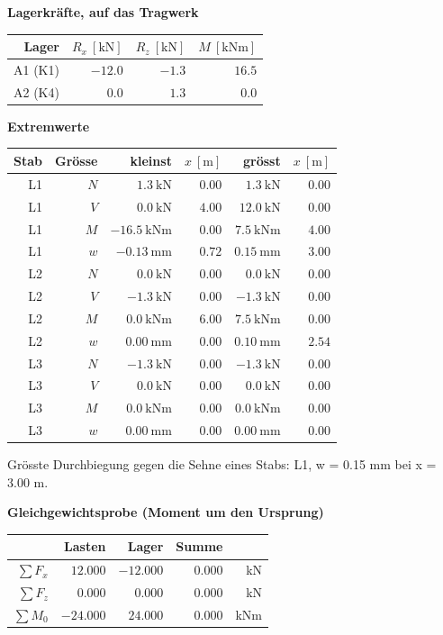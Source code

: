 \documentclass[11pt,a4paper]{article}
\begin{document}
\noindent\textbf{Lagerkräfte, auf das Tragwerk}
\begin{longtable}{rrrr}
\hline
Lager & $R_x\ [\mathrm{kN}]$ & $R_z\ [\mathrm{kN}]$ & $M\ [\mathrm{kNm}]$ \\
\hline
\endhead
A1 (K1) & $-12.0$ & $-1.3$ & $16.5$ \\
A2 (K4) & $0.0$ & $1.3$ & $0.0$ \\
\hline
\end{longtable}
\noindent\textbf{Extremwerte}
\begin{longtable}{rrrrrr}
\hline
Stab & Grösse & kleinst & $x\ [\mathrm{m}]$ & grösst & $x\ [\mathrm{m}]$ \\
\hline
\endhead
L1 & $N$ & $1.3\ \mathrm{kN}$ & $0.00$ & $1.3\ \mathrm{kN}$ & $0.00$ \\
L1 & $V$ & $0.0\ \mathrm{kN}$ & $4.00$ & $12.0\ \mathrm{kN}$ & $0.00$ \\
L1 & $M$ & $-16.5\ \mathrm{kNm}$ & $0.00$ & $7.5\ \mathrm{kNm}$ & $4.00$ \\
L1 & $w$ & $-0.13\ \mathrm{mm}$ & $0.72$ & $0.15\ \mathrm{mm}$ & $3.00$ \\
L2 & $N$ & $0.0\ \mathrm{kN}$ & $0.00$ & $0.0\ \mathrm{kN}$ & $0.00$ \\
L2 & $V$ & $-1.3\ \mathrm{kN}$ & $0.00$ & $-1.3\ \mathrm{kN}$ & $0.00$ \\
L2 & $M$ & $0.0\ \mathrm{kNm}$ & $6.00$ & $7.5\ \mathrm{kNm}$ & $0.00$ \\
L2 & $w$ & $0.00\ \mathrm{mm}$ & $0.00$ & $0.10\ \mathrm{mm}$ & $2.54$ \\
L3 & $N$ & $-1.3\ \mathrm{kN}$ & $0.00$ & $-1.3\ \mathrm{kN}$ & $0.00$ \\
L3 & $V$ & $0.0\ \mathrm{kN}$ & $0.00$ & $0.0\ \mathrm{kN}$ & $0.00$ \\
L3 & $M$ & $0.0\ \mathrm{kNm}$ & $0.00$ & $0.0\ \mathrm{kNm}$ & $0.00$ \\
L3 & $w$ & $0.00\ \mathrm{mm}$ & $0.00$ & $0.00\ \mathrm{mm}$ & $0.00$ \\
\hline
\end{longtable}
Grösste Durchbiegung gegen die Sehne eines Stabs: L1, w = 0.15 mm bei x = 3.00 m.

\noindent\textbf{Gleichgewichtsprobe (Moment um den Ursprung)}
\begin{longtable}{rrrrr}
\hline
 & Lasten & Lager & Summe &  \\
\hline
\endhead
$\sum F_x$ & $12.000$ & $-12.000$ & $0.000$ & kN \\
$\sum F_z$ & $0.000$ & $0.000$ & $0.000$ & kN \\
$\sum M_0$ & $-24.000$ & $24.000$ & $0.000$ & kNm \\
\hline
\end{longtable}
\end{document}
